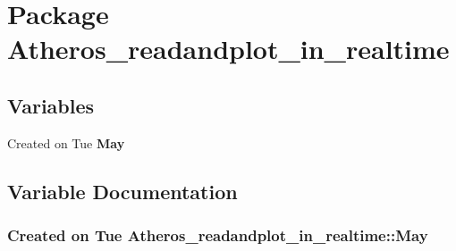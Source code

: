 \section{Package Atheros\_\-readandplot\_\-in\_\-realtime}
\label{namespaceAtheros__readandplot__in__realtime}


\subsection*{Variables}
\begin{CompactItemize}
\item 
Created on Tue {\bf May}
\end{CompactItemize}


\subsection{Variable Documentation}
\subsubsection{\setlength{\rightskip}{0pt plus 5cm}Created on Tue Atheros\_\-readandplot\_\-in\_\-realtime::May}\label{namespaceAtheros__readandplot__in__realtime_a0}


